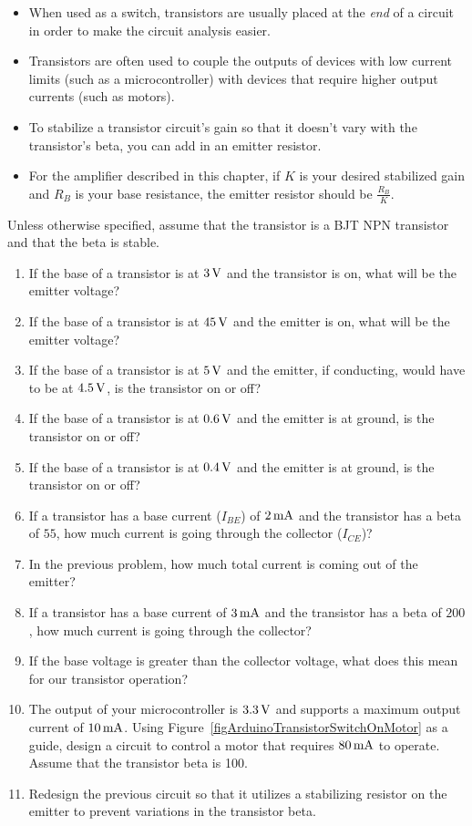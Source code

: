 \begin{itemize}
\item When used as a switch, transistors are usually placed at the \emph{end} of a circuit in order to make the circuit analysis easier.
\item Transistors are often used to couple the outputs of devices with low current limits (such as a microcontroller) with devices that require higher output currents (such as motors).
\item To stabilize a transistor circuit's gain so that it doesn't vary with the transistor's beta, you can add in an emitter resistor.
\item For the amplifier described in this chapter, if $K$ is your desired stabilized gain and $R_B$ is your base resistance, the emitter resistor should be $\frac{R_B}{K}$.
\end{itemize}

\applysection

Unless otherwise specified, assume that the transistor is a BJT NPN transistor and that the beta is stable.

\begin{enumerate}
\item If the base of a transistor is at $3\,\si{\volt}$ and the transistor is on, what will be the emitter voltage?
\item If the base of a transistor is at $45\,\si{\volt}$ and the emitter is on, what will be the emitter voltage?
\item If the base of a transistor is at $5\,\si{\volt}$ and the emitter, if conducting, would have to be at $4.5\,\si{\volt}$, is the transistor on or off?
\item If the base of a transistor is at $0.6\,\si{\volt}$ and the emitter is at ground, is the transistor on or off?
\item If the base of a transistor is at $0.4\,\si{\volt}$ and the emitter is at ground, is the transistor on or off?
\item If a transistor has a base current ($I_{BE}$) of $2\,\si{\milli\ampere}$ and the transistor has a beta of $55$, how much current is going through the collector ($I_{CE}$)?
\item In the previous problem, how much total current is coming out of the emitter?
\item If a transistor has a base current of $3\,\si{\milli\ampere}$ and the transistor has a beta of $200$, how much current is going through the collector?
\item If the base voltage is greater than the collector voltage, what does this mean for our transistor operation?
\item The output of your microcontroller is $3.3\,\si{\volt}$ and supports a maximum output current of $10\,\si{\milli\ampere}$.  Using Figure~\ref{figArduinoTransistorSwitchOnMotor} as a guide, design a circuit to control a motor that requires $80\,\si{\milli\ampere}$ to operate.  Assume that the transistor beta is 100.
\item Redesign the previous circuit so that it utilizes a stabilizing resistor on the emitter to prevent variations in the transistor beta.
\end{enumerate}
